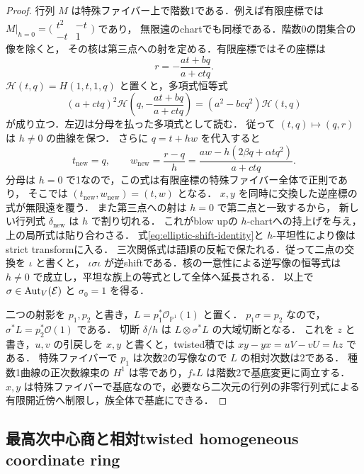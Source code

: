 \begin{proof}
行列 $M$ は特殊ファイバー上で階数1である．例えば有限座標では
$M|_{h=0}=\bigl(\begin{smallmatrix}t^2&-t\\-t&1\end{smallmatrix}\bigr)$ であり，
無限遠のchartでも同様である．階数0の閉集合の像を除くと，
その核は第三点への射を定める．有限座標ではその座標は
\[
 r=-\frac{at+bq}{a+ctq}.
\]
$\mathcal H(t,q)=H(1,t,1,q)$ と置くと，多項式恒等式
\begin{equation}\label{eq:elliptic-shift-identity}
 (a+ctq)^2\mathcal H\left(q,-\frac{at+bq}{a+ctq}\right)
       =(a^2-bcq^2)\mathcal H(t,q)
\end{equation}
が成り立つ．左辺は分母を払った多項式として読む．
従って $(t,q)\mapsto(q,r)$ は $h\ne0$ の曲線を保つ．
さらに $q=t+hw$ を代入すると
\begin{equation}\label{eq:elliptic-resolved-shift}
 t_{\mathrm{new}}=q,\qquad
 w_{\mathrm{new}}=\frac{r-q}{h}
       =\frac{aw-h(2\beta q+\alpha tq^2)}{a+ctq}.
\end{equation}
分母は $h=0$ で1なので，この式は有限座標の特殊ファイバー全体で正則であり，
そこでは $(t_{\mathrm{new}},w_{\mathrm{new}})=(t,w)$ となる．
$x,y$ を同時に交換した逆座標の式が無限遠を覆う．
また第三点への射は $h=0$ で第二点と一致するから，
新しい行列式 $\delta_{\mathrm{new}}$ は $h$ で割り切れる．
これがblow upの $h$-chartへの持上げを与え，上の局所式は貼り合わさる．
式\eqref{eq:elliptic-shift-identity}と $h$-平坦性により像はstrict transformに入る．
三次関係式は語順の反転で保たれる．従って二点の交換を $\iota$ と書くと，
$\iota\sigma\iota$ が逆shiftである．核の一意性による逆写像の恒等式は
$h\ne0$ で成立し，平坦な族上の等式として全体へ延長される．
以上で $\sigma\in\operatorname{Aut}_V(\mathcal E)$ と $\sigma_0=1$ を得る．

二つの射影を $p_1,p_2$ と書き，$L=p_1^*\mathcal O_{\mathbb P^1}(1)$ と置く．
$p_1\sigma=p_2$ なので，$\sigma^*L=p_2^*\mathcal O(1)$ である．
切断 $\delta/h$ は $L\otimes\sigma^*L$ の大域切断となる．
これを $z$ と書き，$u,v$ の引戻しを $x,y$ と書くと，twisted積では
$xy-yx=uV-vU=hz$ である．
特殊ファイバーで $p_1$ は次数2の写像なので $L$ の相対次数は2である．
種数1曲線の正次数線束の $H^1$ は零であり，$f_*L$ は階数2で基底変更に両立する．
$x,y$ は特殊ファイバーで基底なので，必要なら二次元の行列の非零行列式による
有限開近傍へ制限し，族全体で基底にできる．
\end{proof}

\subsection{最高次中心商と相対twisted homogeneous coordinate ring}


